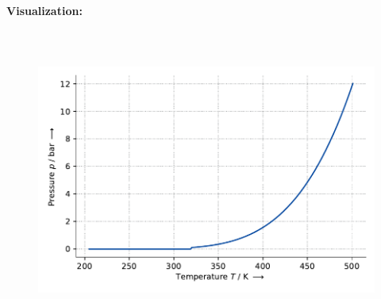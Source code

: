 \textbf{Visualization:}
%
\begin{figure}[!htp]
{\noindent\includegraphics[height=10cm, keepaspectratio]{figs/ref/ref_Toluene_VaporPressure_EoSCubic_2.pdf}}
\end{figure}
%

\FloatBarrier
\newpage
